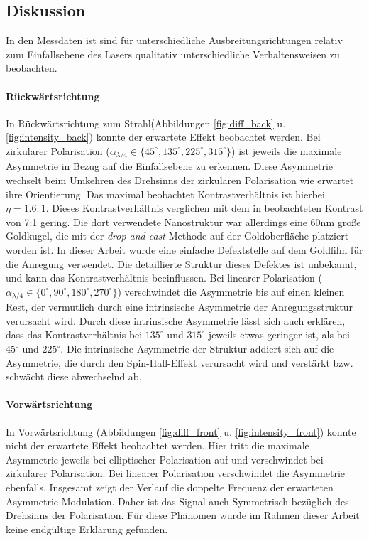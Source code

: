 \documentclass[titlepage]{article}
\begin{document}
	\subsection{Diskussion}
	In den Messdaten ist sind für unterschiedliche Ausbreitungsrichtungen relativ zum Einfallsebene des Lasers qualitativ unterschiedliche Verhaltensweisen zu beobachten.
	\paragraph{Rückwärtsrichtung}
	In Rückwärtsrichtung zum Strahl(Abbildungen \ref{fig:diff_back} u. \ref{fig:intensity_back}) konnte der erwartete Effekt beobachtet werden. Bei zirkularer Polarisation ($\alpha_{\lambda/4} \in \{45^\circ, 135^\circ, 225^\circ, 315^\circ\}$) ist jeweils die maximale Asymmetrie in Bezug auf die Einfallsebene zu erkennen. Diese Asymmetrie wechselt beim Umkehren des Drehsinns der zirkularen Polarisation wie erwartet ihre Orientierung. Das maximal beobachtet Kontrastverhältnis ist hierbei $\eta = 1.6:1$. Dieses Kontrastverhältnis verglichen mit dem in \cite{OConnor.2014} beobachteten Kontrast von 7:1 gering.  Die dort verwendete Nanostruktur war allerdings eine  $60\mathrm{nm}$ große Goldkugel, die mit der \textit{drop and cast} Methode auf der Goldoberfläche platziert worden ist. In dieser Arbeit wurde eine einfache Defektstelle auf dem Goldfilm für die Anregung verwendet. Die detaillierte Struktur dieses Defektes ist unbekannt, und kann das Kontrastverhältnis beeinflussen.  Bei linearer Polarisation ($\alpha_{\lambda/4} \in \{0^\circ, 90^\circ, 180^\circ, 270^\circ\}$) verschwindet die Asymmetrie bis auf einen kleinen Rest, der vermutlich durch eine intrinsische Asymmetrie der Anregungsstruktur verursacht wird. Durch diese intrinsische Asymmetrie lässt sich auch erklären, dass das Kontrastverhältnis bei $135^\circ$ und $ 315^\circ$ jeweils etwas geringer ist, als bei $45^\circ$ und $225^\circ$.
	Die intrinsische Asymmetrie der Struktur addiert sich auf die Asymmetrie, die durch den Spin-Hall-Effekt verursacht wird und verstärkt bzw. schwächt diese abwechselnd ab.
	\paragraph{Vorwärtsrichtung}
	In Vorwärtsrichtung (Abbildungen \ref{fig:diff_front} u. \ref{fig:intensity_front}) konnte nicht der erwartete Effekt beobachtet werden. Hier tritt die maximale Asymmetrie jeweils bei elliptischer Polarisation auf und verschwindet bei zirkularer Polarisation. Bei linearer Polarisation verschwindet die Asymmetrie ebenfalls. Insgesamt zeigt der Verlauf die doppelte Frequenz der erwarteten Asymmetrie Modulation. Daher ist das Signal auch Symmetrisch bezüglich des Drehsinns der Polarisation. Für diese Phänomen wurde im Rahmen dieser Arbeit keine endgültige Erklärung gefunden.
	
\end{document}
